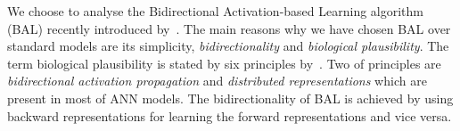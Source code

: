 \label{sec:motivation} 
We choose to analyse the Bidirectional Activation-based Learning algorithm (BAL) recently introduced by~\citet{farkas2013bal}. The main reasons why we have chosen BAL over standard models are its simplicity, \emph{bidirectionality} and \emph{biological plausibility}. The term biological plausibility is stated by six principles by~\citet{hinton1988learning}. Two of principles are \emph{bidirectional activation propagation} and \emph{distributed representations} which are present in most of ANN models. The bidirectionality of BAL is achieved by using backward representations for learning the forward representations and vice versa. 




